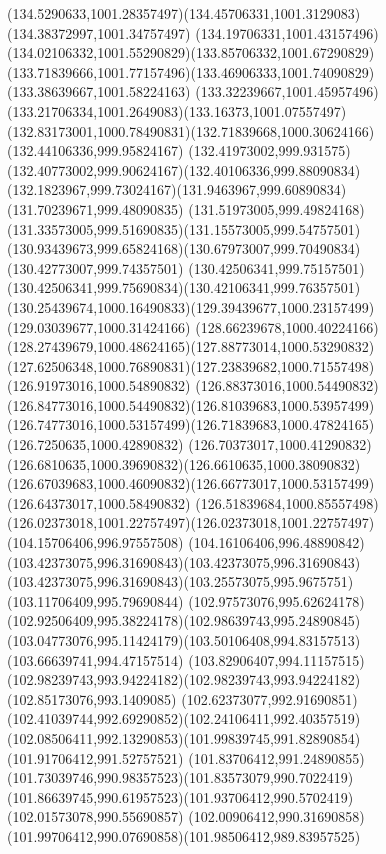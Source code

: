 {{  \curveto(134.5290633,1001.28357497)(134.45706331,1001.3129083)(134.38372997,1001.34757497)
  \curveto(134.19706331,1001.43157496)(134.02106332,1001.55290829)(133.85706332,1001.67290829)
  \curveto(133.71839666,1001.77157496)(133.46906333,1001.74090829)(133.38639667,1001.58224163)
  \curveto(133.32239667,1001.45957496)(133.21706334,1001.2649083)(133.16373,1001.07557497)
  \curveto(132.83173001,1000.78490831)(132.71839668,1000.30624166)(132.44106336,999.95824167)
  \curveto(132.41973002,999.931575)(132.40773002,999.90624167)(132.40106336,999.88090834)
  \curveto(132.1823967,999.73024167)(131.9463967,999.60890834)(131.70239671,999.48090835)
  \curveto(131.51973005,999.49824168)(131.33573005,999.51690835)(131.15573005,999.54757501)
  \curveto(130.93439673,999.65824168)(130.67973007,999.70490834)(130.42773007,999.74357501)
  \curveto(130.42506341,999.75157501)(130.42506341,999.75690834)(130.42106341,999.76357501)
  \curveto(130.25439674,1000.16490833)(129.39439677,1000.23157499)(129.03039677,1000.31424166)
  \curveto(128.66239678,1000.40224166)(128.27439679,1000.48624165)(127.88773014,1000.53290832)
  \curveto(127.62506348,1000.76890831)(127.23839682,1000.71557498)(126.91973016,1000.54890832)
  \curveto(126.88373016,1000.54490832)(126.84773016,1000.54490832)(126.81039683,1000.53957499)
  \curveto(126.74773016,1000.53157499)(126.71839683,1000.47824165)(126.7250635,1000.42890832)
  \curveto(126.70373017,1000.41290832)(126.6810635,1000.39690832)(126.6610635,1000.38090832)
  \curveto(126.67039683,1000.46090832)(126.66773017,1000.53157499)(126.64373017,1000.58490832)
  \curveto(126.51839684,1000.85557498)(126.02373018,1001.22757497)(126.02373018,1001.22757497)
  \lineto(104.15706406,996.97557508)
  \curveto(104.16106406,996.48890842)(103.42373075,996.31690843)(103.42373075,996.31690843)
  \curveto(103.42373075,996.31690843)(103.25573075,995.9675751)(103.11706409,995.79690844)
  \curveto(102.97573076,995.62624178)(102.92506409,995.38224178)(102.98639743,995.24890845)
  \curveto(103.04773076,995.11424179)(103.50106408,994.83157513)(103.66639741,994.47157514)
  \curveto(103.82906407,994.11157515)(102.98239743,993.94224182)(102.98239743,993.94224182)
  \lineto(102.85173076,993.1409085)
  \curveto(102.62373077,992.91690851)(102.41039744,992.69290852)(102.24106411,992.40357519)
  \curveto(102.08506411,992.13290853)(101.99839745,991.82890854)(101.91706412,991.52757521)
  \curveto(101.83706412,991.24890855)(101.73039746,990.98357523)(101.83573079,990.7022419)
  \curveto(101.86639745,990.61957523)(101.93706412,990.5702419)(102.01573078,990.55690857)
  \curveto(102.00906412,990.31690858)(101.99706412,990.07690858)(101.98506412,989.83957525)
}}

